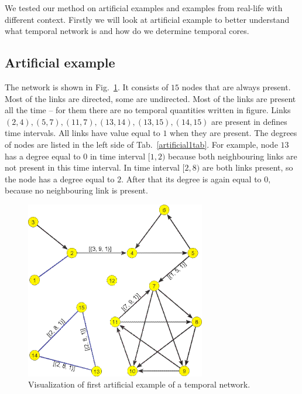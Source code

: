 \documentclass[a4paper,twoside,10pt]{article}
\begin{document}
We tested our method on artificial examples and examples from real-life with different context. Firstly we will look at artificial example to better understand what temporal network is and how do we determine temporal cores. 

\subsection{Artificial example}

The network is shown in Fig.~\ref{artificial1}. It consists of $15$ nodes that are always present. Most of the links are directed, some are undirected. Most of the links are present all the time -- for them there are no temporal quantities written in figure. Links $(2,4), (5,7), (11,7), (13,14), (13,15), (14,15)$ are present in defines time intervals. All links have value equal to $1$ when they are present. The degrees of nodes are listed in the left side of Tab.~\ref{artificial1tab}. For example, node $13$ has a degree equal to $0$ in time interval $[1,2)$ because both neighbouring links are not present in this time interval. In time interval $[2,8)$ are both links present, so the node has a degree equal to $2.$ After that its degree is again equal to $0,$ because no neighbouring link is present.

\begin{figure}[!h]
	\centering
	\includegraphics[width=0.7\textwidth]{./pics/Fig5.png}
  \caption{Visualization of first artificial example of a temporal network.}
  \label{artificial1}
\end{figure}
\end{document}
